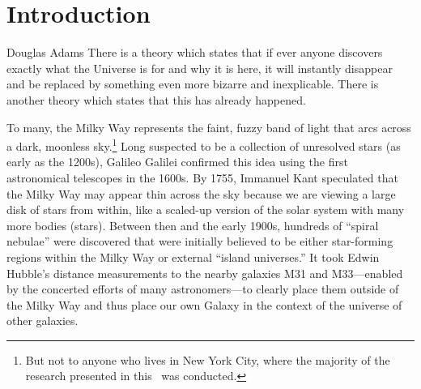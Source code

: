 \chapter[Introduction]{Introduction}
\label{ch:intro}




\vspace{-16pt}
\begin{chapquote}{Douglas Adams}
\singlespacing
There is a theory which states that if ever anyone discovers exactly what the Universe is for and why it is here, it will instantly disappear and be replaced by something even more bizarre and inexplicable. There is another theory which states that this has already happened.
\end{chapquote}
\vspace{-8pt}
\noindent\makebox[\linewidth]{\rule{0.5\textwidth}{0.5pt}}
\vspace{1pt}

To many, the Milky Way represents the faint, fuzzy band of light that arcs across a dark, moonless sky.\footnote{But not to anyone who lives in New York City, where the majority of the research presented in this \article\ was conducted.} Long suspected to be a collection of unresolved stars (as early as the 1200s), Galileo Galilei confirmed this idea using the first astronomical telescopes in the 1600s. By 1755, Immanuel Kant speculated that the Milky Way may appear thin across the sky because we are viewing a large disk of stars from within, like a scaled-up version of the solar system with many more bodies (stars). Between then and the early 1900s, hundreds of ``spiral nebulae'' were discovered that were initially believed to be either star-forming regions within the Milky Way or external ``island universes.'' It took Edwin Hubble's distance measurements to the nearby galaxies M31 and M33---enabled by the concerted efforts of many astronomers---to clearly place them outside of the Milky Way and thus place our own Galaxy in the context of the universe of other galaxies.

